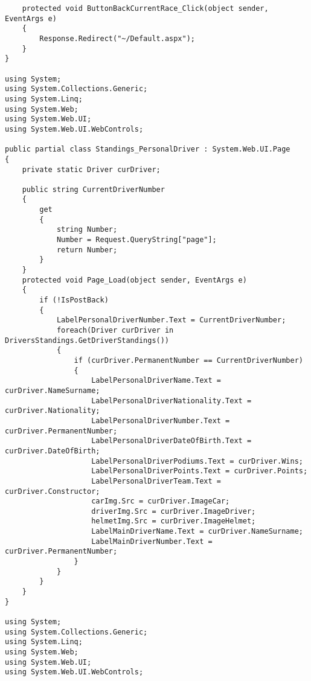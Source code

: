 \documentclass[14pt,a4paper]{extreport}
\begin{document}
\begin{landscape}
\begin{lstlisting}
    protected void ButtonBackCurrentRace_Click(object sender, EventArgs e)
    {
        Response.Redirect("~/Default.aspx");
    }
}

using System;
using System.Collections.Generic;
using System.Linq;
using System.Web;
using System.Web.UI;
using System.Web.UI.WebControls;

public partial class Standings_PersonalDriver : System.Web.UI.Page
{
    private static Driver curDriver;

    public string CurrentDriverNumber
    {
        get
        {
            string Number;
            Number = Request.QueryString["page"];
            return Number;
        }
    }
    protected void Page_Load(object sender, EventArgs e)
    {
        if (!IsPostBack)
        {
            LabelPersonalDriverNumber.Text = CurrentDriverNumber;
            foreach(Driver curDriver in DriversStandings.GetDriverStandings())
            {
                if (curDriver.PermanentNumber == CurrentDriverNumber)
                {
                    LabelPersonalDriverName.Text = curDriver.NameSurname;
                    LabelPersonalDriverNationality.Text = curDriver.Nationality;
                    LabelPersonalDriverNumber.Text = curDriver.PermanentNumber;
                    LabelPersonalDriverDateOfBirth.Text = curDriver.DateOfBirth;
                    LabelPersonalDriverPodiums.Text = curDriver.Wins;
                    LabelPersonalDriverPoints.Text = curDriver.Points;
                    LabelPersonalDriverTeam.Text = curDriver.Constructor;
                    carImg.Src = curDriver.ImageCar;
                    driverImg.Src = curDriver.ImageDriver;
                    helmetImg.Src = curDriver.ImageHelmet;
                    LabelMainDriverName.Text = curDriver.NameSurname;
                    LabelMainDriverNumber.Text = curDriver.PermanentNumber;
                }
            }
        }
    }
}

using System;
using System.Collections.Generic;
using System.Linq;
using System.Web;
using System.Web.UI;
using System.Web.UI.WebControls;


\end{lstlisting}
\end{landscape}
\end{document}
